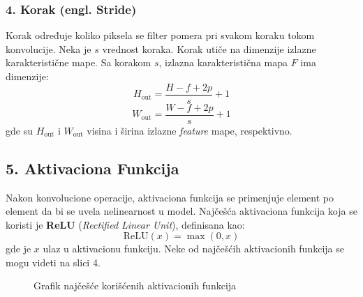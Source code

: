 \documentclass[12pt]{article}
\begin{document}
   \subsubsection*{4. Korak (engl. Stride)}
   Korak određuje koliko piksela se filter pomera pri svakom koraku tokom konvolucije. 
   Neka je \( s \) vrednost koraka. Korak utiče na dimenzije izlazne karakteristične mape. 
   Sa korakom \( s \), izlazna karakteristična mapa \( F \) ima dimenzije:
   \[
      H_{\text{out}} = \frac{H - f + 2p}{s} + 1
   \]
   \[
   W_{\text{out}} = \frac{W - f + 2p}{s} + 1
   \]
   gde su \( H_{\text{out}} \) i \( W_{\text{out}} \) visina i širina izlazne \textit{feature} mape, 
   respektivno.

   \subsection*{5. Aktivaciona Funkcija}

   Nakon konvolucione operacije, aktivaciona funkcija se primenjuje element po element da bi se 
   uvela nelinearnost u model. Najčešća aktivaciona funkcija koja se koristi je 
   \textbf{ReLU} (\textit{Rectified Linear Unit}), definisana kao:
   \[
   \text{ReLU}(x) = \max(0, x)
   \]
   gde je \( x \) ulaz u aktivacionu funkciju. Neke od najčešćih aktivacionih funkcija se mogu 
   videti na slici 4.

   \begin{figure}[h!]
      \centering
      \caption{Grafik najčešće korišćenih aktivacionih funkcija}
      \label{fig:pop_activations}
    \end{figure}

    \newpage 
    
\end{document}
